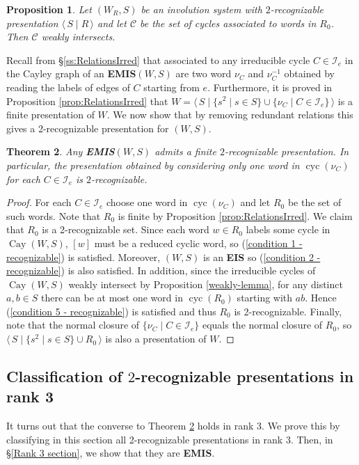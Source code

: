 \documentclass[A4paper, oneside]{amsart}
\newcommand{\id}{\textit{e}}
\newcommand{\mpair}[1]{\langle\, #1\,\rangle}  %
\newcommand{\Cay}{\operatorname{Cay}}
\newcommand{\cyc}{\operatorname{cyc}}
\newcommand{\Irr}{\mathcal{I}}
\newcommand{\EIS}{\textnormal{\bf EIS}\xspace}
\newcommand{\EMIS}{\textnormal{\bf EMIS}\xspace}
\newtheorem{thm}{Theorem}[section]
\newtheorem{prop}[thm]{Proposition}
\theoremstyle{definition}
\begin{document}
\begin{prop} \label{prop: 2-rec weakly intersects}
	Let $(W_R,S)$ be an involution system with $2$-recognizable presentation $\mpair{S\mid R}$ and let $\mathcal{C}$ be the set of cycles associated to words in $R_0$. Then $\mathcal{C}$ weakly intersects.
\end{prop}

Recall from \S\ref{ss:RelationsIrred} that associated to any irreducible cycle $C \in \Irr_{\id}$ in the Cayley graph of an \EMIS $(W,S)$ are two word $\nu_C$ and $\nu_C^{-1}$ obtained by reading the labels of edges of $C$ starting from $\id$. Furthermore, it is proved in Proposition \ref{prop:RelationsIrred} that $W=\mpair{S \mid \{s^2 \mid s \in S\} \cup \{\nu_C \mid C \in \Irr_\id\}}$ is a finite presentation of $W$. We now show that by removing redundant relations this gives a 2-recognizable presentation for $(W,S)$.

\begin{thm} \label{thm:EMIS is recognizable} Any \EMIS $(W,S)$ admits a finite $2$-recognizable presentation. In particular, the presentation obtained by considering only one word in $\cyc(\nu_C)$ for each $C \in \Irr_{\id}$ is $2$-recognizable.
\end{thm}

\begin{proof}
	For each $C \in \Irr_{e}$ choose one word in $\cyc(\nu_C)$ and let $R_0$ be the set of such words. Note that $R_0$ is finite by Proposition \ref{prop:RelationsIrred}. We claim that $R_0$ is a 2-recognizable set. Since each word $w \in R_0$ labels some cycle in $\Cay(W,S)$, $[w]$ must be a reduced cyclic word, so (\ref{condition 1 - recognizable}) is satisfied. Moreover, $(W,S)$ is an \EIS so (\ref{condition 2 - recognizable}) is also satisfied. In addition, since the irreducible cycles of $\Cay(W,S)$ weakly intersect by Proposition \ref{weakly-lemma}, for any distinct $a,b \in S$ there can be at most one word in $\cyc(R_0)$ starting with $ab$. Hence (\ref{condition 5 - recognizable}) is satisfied and thus $R_0$ is 2-recognizable. Finally, note that the normal closure of $\{\nu_C \mid C \in \Irr_{\id}\}$ equals the normal closure of $R_0$, so $\mpair{S\mid \{s^2 \mid s \in S\} \cup R_0}$ is also a presentation of $W$.  
\end{proof}

\subsection{Classification of $2$-recognizable presentations in rank 3} It turns out that the converse to Theorem \ref{thm:EMIS is recognizable} holds in rank 3. We prove this by classifying in this section all 2-recognizable presentations in rank 3. Then, in \S\ref{Rank 3 section}, we show that they are \EMIS.
\end{document}
